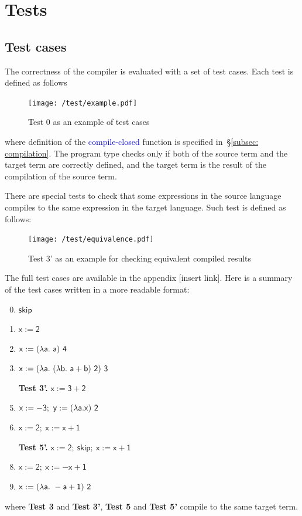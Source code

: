 \documentclass[12pt,a4paper]{report}
\theoremstyle{definition}
\newcommand{\secref}[1]{\S\ref{#1}}
\newcommand{\mb}[1]{\textcolor{mediumblue}{#1}}
\begin{document}
    \section{Tests}
    \subsection{Test cases}
    The correctness of the compiler is evaluated with a set of test cases. Each test is defined as follows
    \begin{figure}[H]
        \centering
        \texttt{[image: /test/example.pdf]}
        \caption{Test 0 as an example of test cases}
        \label{fig: test_case_0}
    \end{figure}
    where definition of the \mb{\textsf{compile-closed}} function is specified in~\secref{subsec: compilation}. The program type checks only if both of the source term and the target term are correctly defined, and the target term is the result of the compilation of the source term. 

    There are special tests to check that some expressions in the source language compiles to the same expression in the target language. Such test is defined as follows:
    \begin{figure}[H]
        \centering
        \texttt{[image: /test/equivalence.pdf]}
        \caption{Test 3' as an example for checking equivalent compiled results}
        \label{fig: test_case_3'}
    \end{figure}

    The full test cases are available in the appendix [insert link]. Here is a summary of the test cases written in a more readable format:
    \begin{enumerate}[label=\textbf{Test \arabic*.}, leftmargin=*]
        \setcounter{enumi}{-1}
        \item $\mathsf{skip}$
        \item $\mathsf{x := 2}$
        \item $\mathsf{x := (\mathnormal{\lambda} a.\ a)\ 4}$
        \item $\mathsf{x := (\mathnormal{\lambda} a.\ (\mathnormal{\lambda} b.\ a+b)\ 2)\ 3}$
        \item[\textbf{Test 3'.}] $\mathsf{x := 3 + 2}$
        \item $\mathsf{x := -3;\ y := (\mathnormal{\lambda} a. x)\ 2}$
        \item $\mathsf{x := 2;\ x := x + 1}$
        \item[\textbf{Test 5'.}] $\mathsf{x := 2;\ skip;\ x := x + 1}$
        \item $\mathsf{x := 2;\ x := -x + 1}$
        \item $\mathsf{x := (\mathnormal{\lambda} a.\ -a+1)\ 2}$
    \end{enumerate}
    where \textbf{Test 3} and \textbf{Test 3'}, \textbf{Test 5} and \textbf{Test 5'} compile to the same target term. 
    
\end{document}
